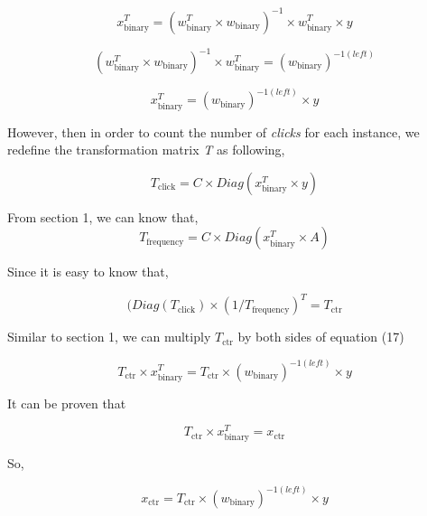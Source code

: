 \documentclass{sig-alternate}
\begin{document}
\begin{equation}
x_{\text{binary}}^T = (w_{\text{binary}}^T \times w_{\text{binary}})^{-1} \times w_{\text{binary}}^T \times y 
\end{equation}

\begin{equation}
(w_{\text{binary}}^T \times w_{\text{binary}})^{-1} \times w_{\text{binary}}^T = (w_{\text{binary}})^{-1(left)}  
\end{equation}

\begin{equation}
x_{\text{binary}}^T =  (w_{\text{binary}})^{-1(left)} \times y 
\end{equation}

However, then in order to count the number of \textsl{clicks} for each instance, we redefine the transformation matrix \textsl{T} as following, 

\begin{equation}
T_{\text{click}} = C \times Diag(x_{\text{binary}}^T \times y)
\end{equation}



From section 1, we can know that, 
\begin{equation}
T_{\text{frequency}} = C \times Diag(x_{\text{binary}}^T \times A)
\end{equation}

Since it is easy to know that,

\begin{equation}
(Diag(T_{\text{click}}) \times (1/T_{\text{frequency}} )^T =  T_{\text{ctr}}
\end{equation}

Similar to section 1, we can multiply \(T_{\text{ctr}}\) by both sides of equation (17)

\begin{equation}
T_{\text{ctr}} \times x_{\text{binary}}^T =  T_{\text{ctr}} \times (w_{\text{binary}})^{-1(left)} \times y 
\end{equation}

It can be proven that 

\begin{equation}
T_{\text{ctr}} \times x_{\text{binary}}^T =  x_{\text{ctr}}
\end{equation}

So,

\begin{equation}
 x_{\text{ctr}} =  T_{\text{ctr}} \times (w_{\text{binary}})^{-1(left)} \times y 
\end{equation}
\end{document}
